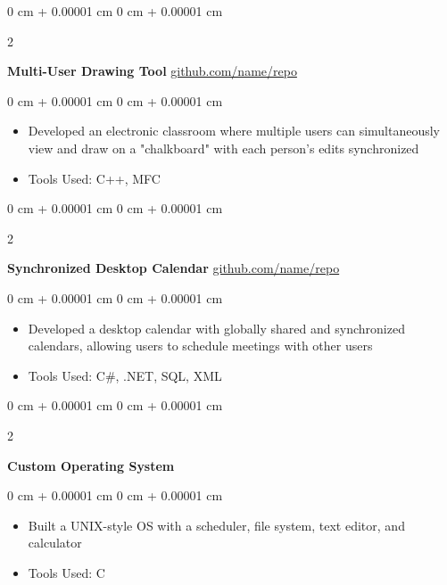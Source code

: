 \documentclass[10pt, letterpaper]{article}
\newenvironment{highlights}{
    \begin{itemize}[
        topsep=0.10 cm,
        parsep=0.10 cm,
        partopsep=0pt,
        itemsep=0pt,
        leftmargin=0 cm + 10pt
    ]
}{
    \end{itemize}
} %
\newenvironment{onecolentry}{
    \begin{adjustwidth}{
        0 cm + 0.00001 cm
    }{
        0 cm + 0.00001 cm
    }
}{
    \end{adjustwidth}
} %
\newenvironment{twocolentry}[2][]{
    \onecolentry
    \def\secondColumn{#2}
    \setcolumnwidth{\fill, 4.5 cm}
    \begin{paracol}{2}
}{
    \switchcolumn \raggedleft \secondColumn
    \end{paracol}
    \endonecolentry
} %
\begin{document}
        
        \begin{twocolentry}{
            \href{https://github.com/sinaatalay/rendercv}{github.com/name/repo}
        }
            \textbf{Multi-User Drawing Tool}\end{twocolentry}

        \vspace{0.10 cm}
        \begin{onecolentry}
            \begin{highlights}
                \item Developed an electronic classroom where multiple users can simultaneously view and draw on a "chalkboard" with each person's edits synchronized
                \item Tools Used: C++, MFC
            \end{highlights}
        \end{onecolentry}


        \vspace{0.2 cm}

        \begin{twocolentry}{
            \href{https://github.com/sinaatalay/rendercv}{github.com/name/repo}
        }
            \textbf{Synchronized Desktop Calendar}\end{twocolentry}

        \vspace{0.10 cm}
        \begin{onecolentry}
            \begin{highlights}
                \item Developed a desktop calendar with globally shared and synchronized calendars, allowing users to schedule meetings with other users
                \item Tools Used: C\#, .NET, SQL, XML
            \end{highlights}
        \end{onecolentry}


        \vspace{0.2 cm}

        \begin{twocolentry}{
            2002
        }
            \textbf{Custom Operating System}\end{twocolentry}

        \vspace{0.10 cm}
        \begin{onecolentry}
            \begin{highlights}
                \item Built a UNIX-style OS with a scheduler, file system, text editor, and calculator
                \item Tools Used: C
            \end{highlights}
        \end{onecolentry}
\end{document}
